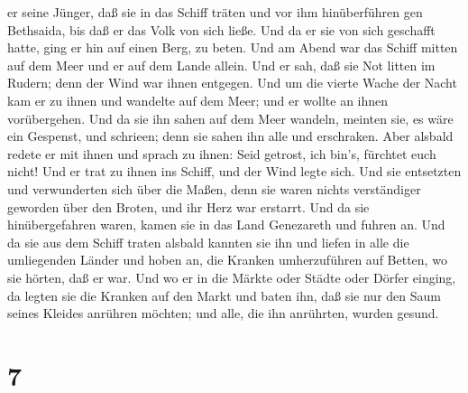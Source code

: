 er seine Jünger, daß sie in das Schiff träten und vor ihm hinüberführen
gen Bethsaida, bis daß er das Volk von sich ließe.  Und da
er sie von sich geschafft hatte, ging er hin auf einen Berg, zu beten.
 Und am Abend war das Schiff mitten auf dem Meer und er auf
dem Lande allein.  Und er sah, daß sie Not litten im
Rudern; denn der Wind war ihnen entgegen. Und um die vierte Wache der
Nacht kam er zu ihnen und wandelte auf dem Meer;  und er
wollte an ihnen vorübergehen. Und da sie ihn sahen auf dem Meer wandeln,
meinten sie, es wäre ein Gespenst, und schrieen;  denn sie
sahen ihn alle und erschraken. Aber alsbald redete er mit ihnen und
sprach zu ihnen: Seid getrost, ich bin's, fürchtet euch nicht!
 Und er trat zu ihnen ins Schiff, und der Wind legte sich.
Und sie entsetzten und verwunderten sich über die Maßen, 
denn sie waren nichts verständiger geworden über den Broten, und ihr
Herz war erstarrt.  Und da sie hinübergefahren waren, kamen
sie in das Land Genezareth und fuhren an.  Und da sie aus
dem Schiff traten alsbald kannten sie ihn  und liefen in
alle die umliegenden Länder und hoben an, die Kranken umherzuführen auf
Betten, wo sie hörten, daß er war.  Und wo er in die Märkte
oder Städte oder Dörfer einging, da legten sie die Kranken auf den Markt
und baten ihn, daß sie nur den Saum seines Kleides anrühren möchten; und
alle, die ihn anrührten, wurden gesund.

\hypertarget{section-6}{%
\section{7}\label{section-6}}

